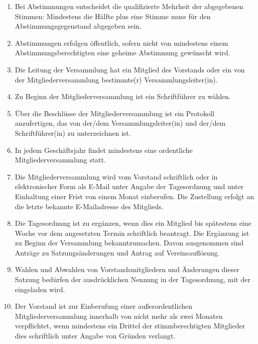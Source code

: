 \documentclass[12pt,a4paper,draft]{article}
\begin{document}
\begin{enumerate}
\item Bei Abstimmungen entscheidet die qualifizierte Mehrheit der abgegebenen 
Stimmen: Mindestens die Hälfte plus eine Stimme muss für den Abstimmungsgegenstand
abgegeben sein.

\item Abstimmungen erfolgen öffentlich, sofern nicht von mindestens einem 
Abstimmungsberechtigten eine geheime Abstimmung gewünscht wird.

\item Die Leitung der Versammlung hat ein Mitglied des Vorstands oder ein von 
der Mitgliederversammlung bestimmte(r) Versammlungsleiter(in).

\item Zu Beginn der Mitgliederversammlung ist ein Schriftführer zu wählen.

\item Über die Beschlüsse der Mitgliederversammlung ist ein Protokoll 
anzufertigen, das von der/dem Versammlungsleiter(in) und der/dem 
Schriftführer(in) zu unterzeichnen ist.


\item In jedem Geschäftsjahr findet mindestens eine ordentliche 
Mitgliederversammlung statt.

\item Die Mitgliederversammlung wird vom Vorstand schriftlich oder in 
elektronischer Form als E-Mail unter Angabe der Tagesordnung und unter 
Einhaltung einer Frist von einem Monat einberufen. %
Die Zustellung erfolgt an die letzte bekannte E-Mailadresse des Mitglieds.

\item Die Tagesordnung ist zu ergänzen, wenn dies ein Mitglied bis spätestens 
eine Woche vor dem angesetzten Termin schriftlich beantragt. Die Ergänzung 
ist zu Beginn der Versammlung bekanntzumachen. Davon ausgenommen sind Anträge zu Satzungsänderungen und Antrag auf Vereinsauflösung.

\item Wahlen und Abwahlen von Vorstandsmitgliedern und Änderungen dieser 
Satzung bedürfen der ausdrücklichen Nennung in der Tagesordnung, mit der 
eingeladen wird.

\item Der Vorstand ist zur Einberufung einer außerordentlichen 
Mitgliederversammlung innerhalb von nicht mehr als zwei Monaten verpflichtet, 
wenn mindestens ein Drittel der stimmberechtigten Mitglieder dies schriftlich unter Angabe von 
Gründen verlangt. %


\end{enumerate}
\end{document}
